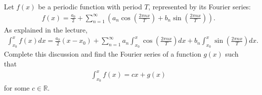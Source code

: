 \documentclass[11pt]{article}
\begin{document}
\begin{exercise}
    Let \( f(x) \) be a periodic function with period \( T \), represented by its Fourier series:
    \begin{align*}
        f(x) = \frac{a_0}{2} + \sum_{n=1}^\infty \left( a_n \cos\left(\frac{2\pi n x}{T}\right) + b_n \sin\left(\frac{2\pi n x}{T}\right) \right).
    \end{align*}
    As explained in the lecture, 
    \begin{align*}
        \int_{x_0}^{x}
        f(x) 
        dx
        = 
        \frac{a_0}{2} ( x - x_0 )
        + 
        \sum_{n=1}^{\infty} 
        a_n 
        \int_{x_0}^{x}
        \cos\left(\frac{2\pi n x}{T}\right)
        dx 
        +
        b_n
        \int_{x_0}^{x}
        \sin\left(\frac{2\pi n x}{T}\right)
        dx
        .
    \end{align*}
    Complete this discussion and find the Fourier series of a function $g(x)$ such that 
    \begin{align}
        \int_{x_0}^{x} f(x) = c x + g(x)
    \end{align}
    for some $c \in \mathbb R$. 
\end{exercise}
\end{document}
